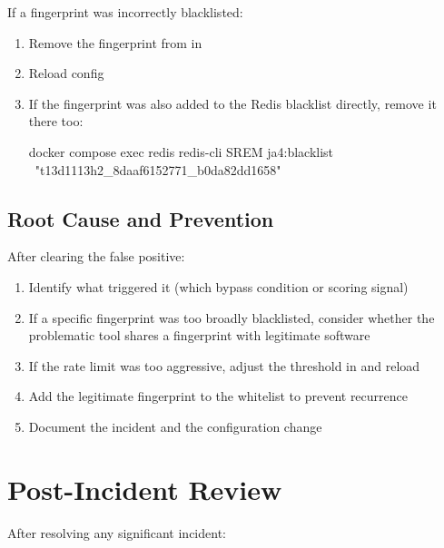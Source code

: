 If a fingerprint was incorrectly blacklisted:

\begin{enumerate}
  \item Remove the fingerprint from  in
  \item Reload config
  \item If the fingerprint was also added to the Redis blacklist directly,
    remove it there too:
\begin{bashcode}
docker compose exec redis redis-cli SREM ja4:blacklist \
  "t13d1113h2_8daaf6152771_b0da82dd1658"
\end{bashcode}
\end{enumerate}

\subsection{Root Cause and Prevention}

After clearing the false positive:

\begin{enumerate}
  \item Identify what triggered it (which bypass condition or scoring signal)
  \item If a specific fingerprint was too broadly blacklisted, consider whether
    the problematic tool shares a fingerprint with legitimate software
  \item If the rate limit was too aggressive, adjust the threshold in
    \code{config/proxy.yml} and reload
  \item Add the legitimate fingerprint to the whitelist to prevent recurrence
  \item Document the incident and the configuration change
\end{enumerate}

\section{Post-Incident Review}

After resolving any significant incident:

